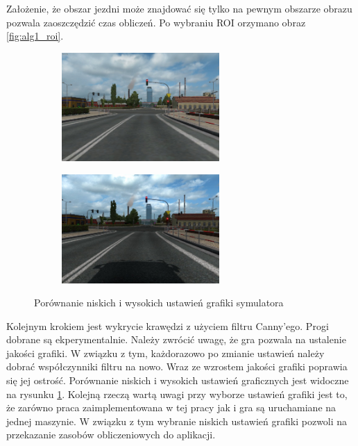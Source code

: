 Założenie, że obszar jezdni może znajdować się tylko na pewnym obszarze obrazu pozwala zaoszczędzić czas obliczeń. Po wybraniu ROI orzymano obraz \ref{fig:alg1_roi}.

\begin{figure}[h]
	\centering
	\begin{subfigure}{0.35\textwidth}
		\centering
		\includegraphics[width=6cm]{img/low_details.jpg}
		\subcaption{\label{fig:low_details}}
	\end{subfigure}
	\begin{subfigure}{0.35\textwidth}
		\centering
		\includegraphics[width=6cm]{img/high_details.jpg}
		\subcaption{\label{fig:high_details}}
	\end{subfigure}
	
	\caption{\label{fig:details1}Porównanie niskich \protect{} i wysokich \protect{} ustawień grafiki symulatora}
\end{figure}

Kolejnym krokiem jest wykrycie krawędzi z użyciem filtru Canny'ego. Progi dobrane są ekperymentalnie. Należy zwrócić uwagę, że gra pozwala na ustalenie jakości grafiki. W związku z tym, każdorazowo po zmianie ustawień należy dobrać współczynniki filtru na nowo. Wraz ze wzrostem jakości grafiki poprawia się jej ostrość. Porównanie niskich i wysokich ustawień graficznych jest widoczne na rysunku \ref{fig:details1}. Kolejną rzeczą wartą uwagi przy wyborze ustawień grafiki jest to, że zarówno praca zaimplementowana w tej pracy jak i gra są uruchamiane na jednej maszynie. W związku z tym wybranie niskich ustawień grafiki pozwoli na przekazanie zasobów obliczeniowych do aplikacji.

